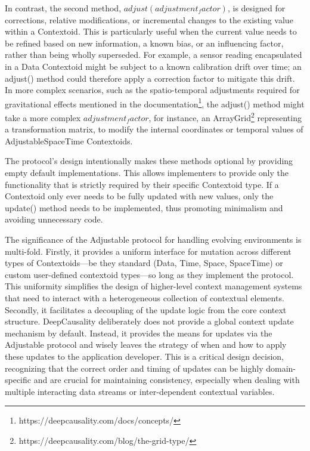 In contrast, the second method, $adjust(adjustment_factor)$, is designed for corrections, relative modifications, or incremental changes to the existing value within a Contextoid. This is particularly useful when the current value needs to be refined based on new information, a known bias, or an influencing factor, rather than being wholly superseded. For example, a sensor reading encapsulated in a Data Contextoid might be subject to a known calibration drift over time; an adjust() method could therefore apply a correction factor to mitigate this drift. In more complex scenarios, such as the spatio-temporal adjustments required for gravitational effects mentioned in the documentation\footnote{https://deepcausality.com/docs/concepts/}, the adjust() method might take a more complex $adjustment_factor$, for instance, an ArrayGrid\footnote{https://deepcausality.com/blog/the-grid-type/} representing a transformation matrix, to modify the internal coordinates or temporal values of AdjustableSpaceTime Contextoids.

The protocol's design intentionally makes these methods optional by providing empty default implementations. This allows implementers to provide only the functionality that is strictly required by their specific Contextoid type. If a Contextoid only ever needs to be fully updated with new values, only the update() method needs to be implemented, thus promoting minimalism and avoiding unnecessary code.

The significance of the Adjustable protocol for handling evolving environments is multi-fold. Firstly, it provides a uniform interface for mutation across different types of Contextoids—be they standard (Data, Time, Space, SpaceTime) or custom user-defined contextoid types—so long as they implement the protocol. This uniformity simplifies the design of higher-level context management systems that need to interact with a heterogeneous collection of contextual elements. Secondly, it facilitates a decoupling of the update logic from the core context structure. DeepCausality deliberately does not provide a global context update mechanism by default. Instead, it provides the means for updates via the Adjustable protocol and wisely leaves the strategy of when and how to apply these updates to the application developer. This is a critical design decision, recognizing that the correct order and timing of updates can be highly domain-specific and are crucial for maintaining consistency, especially when dealing with multiple interacting data streams or inter-dependent contextual variables.

